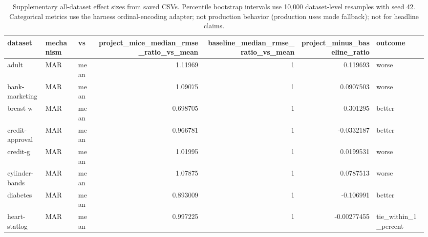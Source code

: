 \begin{table}[ht]
\centering
\caption{Supplementary all-dataset effect sizes from saved CSVs. Percentile bootstrap intervals use 10,000 dataset-level resamples with seed 42. Categorical metrics use the harness ordinal-encoding adapter; not production behavior (production uses mode fallback); not for headline claims.}
\label{tab:protocol_a_effect_sizes_by_dataset_all_datasets_supplementary}
\begin{tabular}{lllrrrl}
\hline
 dataset              & mechanism   & vs               &   project\_mice\_median\_rmse\_ratio\_vs\_mean &   baseline\_median\_rmse\_ratio\_vs\_mean &   project\_minus\_baseline\_ratio & outcome              \\
\hline
 adult                & MAR         & mean             &                                 1.11969  &                             1        &                     0.119693   & worse                \\
 bank-marketing       & MAR         & mean             &                                 1.09075  &                             1        &                     0.0907503  & worse                \\
 breast-w             & MAR         & mean             &                                 0.698705 &                             1        &                    -0.301295   & better               \\
 credit-approval      & MAR         & mean             &                                 0.966781 &                             1        &                    -0.0332187  & better               \\
 credit-g             & MAR         & mean             &                                 1.01995  &                             1        &                     0.0199531  & worse                \\
 cylinder-bands       & MAR         & mean             &                                 1.07875  &                             1        &                     0.0787513  & worse                \\
 diabetes             & MAR         & mean             &                                 0.893009 &                             1        &                    -0.106991   & better               \\
 heart-statlog        & MAR         & mean             &                                 0.997225 &                             1        &                    -0.00277455 & tie\_within\_1\_percent \\

\end{tabular}
\end{table}
